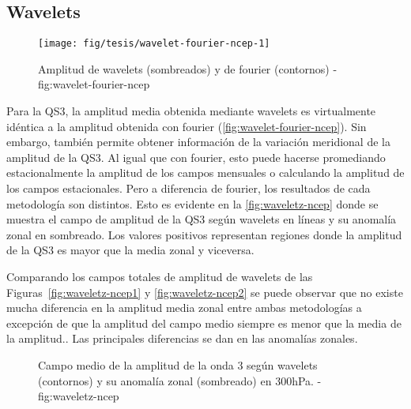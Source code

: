 \documentclass[spanish,a4paper]{book}
\begin{document}
\subsection{Wavelets}\label{wavelets}

\begin{figure}

{\centering \texttt{[image: fig/tesis/wavelet-fourier-ncep-1]} 

}

\caption{Amplitud de wavelets (sombreados) y de fourier (contornos) - fig:wavelet-fourier-ncep}\label{fig:wavelet-fourier-ncep}
\end{figure}

Para la QS3, la amplitud media obtenida mediante wavelets
 es virtualmente idéntica a la
amplitud obtenida con fourier (\autoref{fig:wavelet-fourier-ncep}). Sin
embargo, también permite obtener información de la variación meridional
de la amplitud de la QS3. Al igual que con fourier, esto puede hacerse
promediando estacionalmente la amplitud de los campos mensuales o
calculando la amplitud de los campos estacionales. Pero a diferencia de
fourier, los resultados de cada metodología son distintos. Esto es
evidente en la \autoref{fig:waveletz-ncep} donde se muestra el campo de
amplitud de la QS3 según wavelets en líneas y su anomalía zonal en
sombreado. Los valores positivos representan regiones donde la amplitud
de la QS3 es mayor que la media zonal y viceversa.

Comparando los campos totales de amplitud de wavelets de las
Figuras~\ref{fig:waveletz-ncep1} y \ref{fig:waveletz-ncep2} se puede
observar que no existe mucha diferencia en la amplitud media zonal entre
ambas metodologías a excepción de que la amplitud del campo medio
siempre es menor que la media de la
amplitud..
Las principales diferencias se dan en las anomalías zonales.

\begin{figure*}
\newline{}\caption{Campo medio de la amplitud de la onda 3 según wavelets (contornos) y su anomalía zonal (sombreado) en 300hPa. - fig:waveletz-ncep}\label{fig:waveletz-ncep}
\end{figure*}
\end{document}
